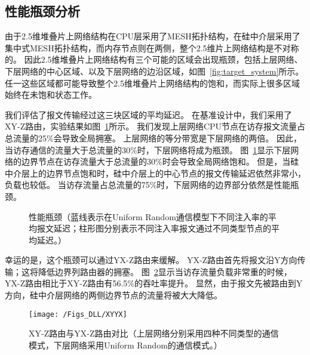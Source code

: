 \subsection{性能瓶颈分析}

由于2.5维堆叠片上网络结构在CPU层采用了MESH拓扑结构，在硅中介层采用了集中式MESH拓扑结构，而内存节点则在两侧，整个2.5维片上网络结构是不对称的。
因此2.5维堆叠片上网络结构有三个可能的区域会出现瓶颈，包括上层网络、下层网络的中心区域、以及下层网络的边沿区域，如图~\ref{fig:target_system}所示。
任一这些区域都可能导致整个2.5维堆叠片上网络结构的饱和，而实际上很多区域始终在未饱和状态工作。

我们评估了报文传输经过这三块区域的平均延迟。
在基准设计中，我们采用了XY-Z路由，实验结果如图~\ref{fig:bottleneck}所示。
我们发现上层网络CPU节点在访存报文流量占总流量的25\%会导致全局拥塞。
上层网络的等分带宽是下层网络的两倍。
因此，当访存通信的流量大于总流量的30\%时，下层网络将成为瓶颈。
图~\ref{fig:bottleneck}显示下层网络的边界节点在访存流量大于总流量的30\%时会导致全局网络饱和。
但是，当硅中介层上的边界节点饱和时，硅中介层上的中心节点的报文传输延迟依然非常小，负载也较低。
当访存流量占总流量的75\%时，下层网络的边界部分依然是性能瓶颈。

\begin{figure}[htb]
\centering
{} 
\qquad
{}
\caption{性能瓶颈（蓝线表示在Uniform Random通信模型下不同注入率的平均报文延迟；柱形图分别表示不同注入率报文通过不同类型节点的平均延迟。）}
\label{fig:bottleneck}
\end{figure}


幸运的是，这个瓶颈可以通过YX-Z路由来缓解。
YX-Z路由首先将报文沿Y方向传输；这将降低边界列路由器的拥塞。
图~\ref{fig:XYYX}显示当访存流量负载非常重的时候，YX-Z路由相比于XY-Z路由有56.5\%的吞吐率提升。
显然，由于报文先被路由到Y方向，硅中介层网络的两侧边界节点的流量将被大大降低。

\begin{figure}[htbp] %
  \centering
  \texttt{[image: /Figs\_DLL/XYYX]}
  \caption{XY-Z路由与YX-Z路由对比（上层网络分别采用四种不同类型的通信模式，下层网络采用Uniform Random的通信模式。）}
  \label{fig:XYYX}
\end{figure}

